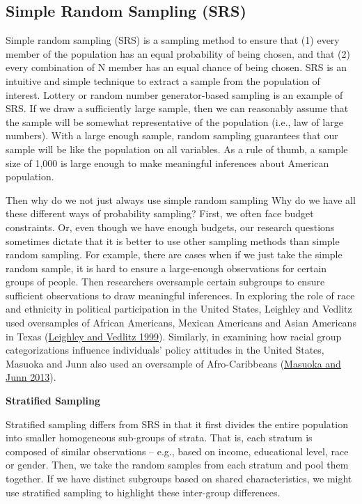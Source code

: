 \documentclass{book}
\begin{document}
\hypertarget{simple-random-sampling-srs}{%
\subsection{Simple Random Sampling (SRS)}\label{simple-random-sampling-srs}}

Simple random sampling (SRS) is a sampling method to ensure that (1) every
member of the population has an equal probability of being chosen, and that
(2) every combination of N member has an equal chance of being chosen. SRS is
an intuitive and simple technique to extract a sample from the population of
interest. Lottery or random number generator-based sampling is an example of
SRS. If we draw a sufficiently large sample, then we can reasonably assume
that the sample will be somewhat representative of the population (i.e., law
of large numbers). With a large enough sample, random sampling guarantees that
our sample will be like the population on all variables. As a rule of thumb, a
sample size of 1,000 is large enough to make meaningful inferences about
American population.

Then why do we not just always use simple random sampling Why do we have all
these different ways of probability sampling? First, we often face budget
constraints. Or, even though we have enough budgets, our research questions
sometimes dictate that it is better to use other sampling methods than simple
random sampling. For example, there are cases when if we just take the simple
random sample, it is hard to ensure a large-enough observations for certain
groups of people. Then researchers oversample certain subgroups to ensure
sufficient observations to draw meaningful inferences. In exploring the role
of race and ethnicity in political participation in the United States,
Leighley and Vedlitz used oversamples of African Americans, Mexican Americans
and Asian Americans in Texas
(\protect\hyperlink{ref-leighley1999race}{Leighley and Vedlitz 1999}).
Similarly, in examining how racial group categorizations influence
individuals' policy attitudes in the United States, Masuoka and Junn also used
an oversample of Afro-Caribbeans
(\protect\hyperlink{ref-masuoka2013politics}{Masuoka and Junn 2013}).

\textbf{Stratified Sampling}

Stratified sampling differs from SRS in that it first divides the entire
population into smaller homogeneous sub-groups of strata. That is, each
stratum is composed of similar observations -- e.g., based on income,
educational level, race or gender. Then, we take the random samples from each
stratum and pool them together. If we have distinct subgroups based on shared
characteristics, we might use stratified sampling to highlight these
inter-group differences.
\end{document}
